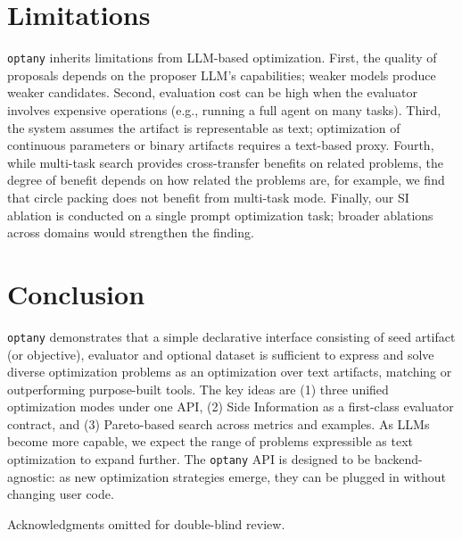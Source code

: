 \documentclass[sigconf,anonymous,review]{acmart}
\newcommand{\oa}{\texttt{optany}}
\newcommand{\asi}{SI}
\begin{document}
\section{Limitations}\label{sec:limitations}

\oa{} inherits limitations from LLM-based optimization. First, the quality of proposals depends on the proposer LLM's capabilities; weaker models produce weaker candidates. Second, evaluation cost can be high when the evaluator involves expensive operations (e.g., running a full agent on many tasks). Third, the system assumes the artifact is representable as text; optimization of continuous parameters or binary artifacts requires a text-based proxy. Fourth, while multi-task search provides cross-transfer benefits on related problems, the degree of benefit depends on how related the problems are, for example, we find that circle packing does not benefit from multi-task mode. Finally, our \asi{} ablation is conducted on a single prompt optimization task; broader ablations across domains would strengthen the finding.


\section{Conclusion}\label{sec:conclusion}

\oa{} demonstrates that a simple declarative interface consisting of seed artifact (or objective), evaluator and optional dataset is sufficient to express and solve diverse optimization problems as an optimization over text artifacts, matching or outperforming purpose-built tools. The key ideas are (1) three unified optimization modes under one API, (2) Side Information as a first-class evaluator contract, and (3) Pareto-based search across metrics and examples. As LLMs become more capable, we expect the range of problems expressible as text optimization to expand further. The \oa{} API is designed to be backend-agnostic: as new optimization strategies emerge, they can be plugged in without changing user code.


\begin{acks}
Acknowledgments omitted for double-blind review.
\end{acks}



\end{document}
